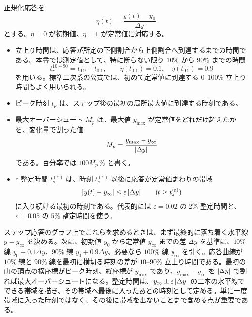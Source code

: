 \begin{definition}
正規化応答を
\begin{equation}
  \eta(t)=\frac{y(t)-y_0}{\Delta y}
\end{equation}
とする。$\eta=0$ が初期値、$\eta=1$ が定常値に対応する。
\begin{itemize}
  \item 立上り時間は、応答が所定の下側割合から上側割合へ到達するまでの時間である。本書では測定値として、特に断らない限り $10\%$ から $90\%$ までの時間
  \begin{equation}
    t_r^{10-90}=t_{0.9}-t_{0.1},
    \qquad \eta(t_{0.1})=0.1,\quad \eta(t_{0.9})=0.9
  \end{equation}
  を用いる。標準二次系の公式では、初めて定常値に到達する $0$--$100\%$ 立上り時間もよく用いられる。
  \item ピーク時刻 $t_p$ は、ステップ後の最初の局所最大値に到達する時刻である。
  \item 最大オーバーシュート $M_p$ は、最大値 $y_{\max}$ が定常値をどれだけ超えたかを、変化量で割った値
  \begin{equation}
    M_p=\frac{y_{\max}-y_\infty}{\left|\Delta y\right|}
  \end{equation}
  である。百分率では $100M_p\,\%$ と書く。
  \item $\varepsilon$ 整定時間 $t_s^{(\varepsilon)}$ は、時刻 $t_s^{(\varepsilon)}$ 以後に応答が定常値まわりの帯域
  \begin{equation}
    \left|y(t)-y_\infty\right|\le \varepsilon\left|\Delta y\right|
    \qquad (t\ge t_s^{(\varepsilon)})
  \end{equation}
  に入り続ける最初の時刻である。代表的には $\varepsilon=0.02$ の $2\%$ 整定時間と、$\varepsilon=0.05$ の $5\%$ 整定時間を使う。
\end{itemize}
\end{definition}

ステップ応答のグラフ上でこれらを求めるときは、まず最終的に落ち着く水平線 $y=y_\infty$ を決める。次に、初期値 $y_0$ から定常値 $y_\infty$ までの差 $\Delta y$ を基準に、$10\%$ 線 $y_0+0.1\Delta y$、$90\%$ 線 $y_0+0.9\Delta y$、必要なら $100\%$ 線 $y_\infty$ を引く。応答曲線が $10\%$ 線と $90\%$ 線を最初に横切る時刻の差が $10$--$90\%$ 立上り時間である。最初の山の頂点の横座標がピーク時刻、縦座標が $y_{\max}$ であり、$y_{\max}-y_\infty$ を $\left|\Delta y\right|$ で割れば最大オーバーシュートになる。整定時間は、$y_\infty\pm\varepsilon\left|\Delta y\right|$ の二本の水平線でできる帯域を描き、その帯域へ最後に入ったあとの時刻として定める。単に一度帯域に入った時刻ではなく、その後に帯域を出ないことまで含める点が重要である。

